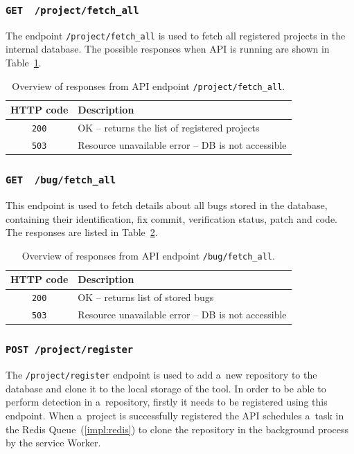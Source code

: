   \subsubsection*{\texttt{GET \ /project/fetch\_all}}
  The endpoint \texttt{/project/fetch\_all} is used to fetch all registered projects in the internal database. The possible responses
  when API is running are shown in Table~\ref{tab:project-fetchall}.

  \begin{table}[h]
        \centering
        \begin{tabular}{|c|l|}
          \hline
            HTTP code & Description \\
          \hline
            \texttt{200} & OK -- returns the list of registered projects \\
            \texttt{503} & Resource unavailable error -- DB is not accessible \\
          \hline
        \end{tabular}
        \caption{Overview of responses from API endpoint \texttt{/project/fetch\_all}.}
        \label{tab:project-fetchall}
    \end{table}

  \subsubsection*{\texttt{GET \ /bug/fetch\_all}}
  This endpoint is used to fetch details about all bugs stored in the database, containing their identification,
  fix commit, verification status, patch and code. The responses are listed in Table~\ref{tab:bug-fetchall}.

  \begin{table}[h]
        \centering
        \begin{tabular}{|c|l|}
          \hline
            HTTP code & Description \\
          \hline
            \texttt{200} & OK -- returns list of stored bugs \\
            \texttt{503} & Resource unavailable error -- DB is not accessible \\
          \hline
        \end{tabular}
        \caption{Overview of responses from API endpoint \texttt{/bug/fetch\_all}.}
        \label{tab:bug-fetchall}
    \end{table}

  \subsubsection*{\texttt{POST /project/register}}
  The \texttt{/project/register} endpoint is used to add a~new repository to the database and clone it to the local storage
  of the tool. In order to be able to perform detection in a~repository, firstly it needs to be registered using this endpoint.
  When a~project is successfully registered the API schedules a~task in the Redis Queue~(\ref{impl:redis}) to clone the repository
  in the background process by the service Worker.


